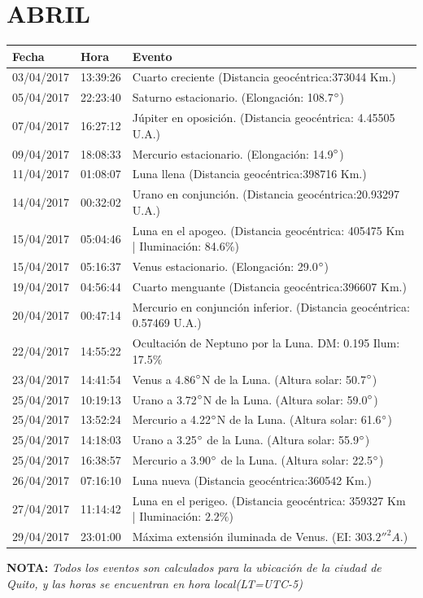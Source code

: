 \documentclass[12pt,a4paper,oneside]{article}
\begin{document}
\section{ABRIL}
\begin{center}
\begin{tabular}{ |l| l| l| }
\hline
 \textbf{Fecha} & \textbf{Hora} & \textbf{Evento}\\
 \hline
03/04/2017& 13:39:26 &	Cuarto creciente (Distancia geocéntrica:373044 Km.)	\\
05/04/2017& 22:23:40 &	Saturno estacionario. (Elongación: 108.7$\degree $)	\\
07/04/2017& 16:27:12 &	Júpiter en oposición. (Distancia geocéntrica: 4.45505 U.A.)	\\
09/04/2017& 18:08:33 &	Mercurio estacionario. (Elongación: 14.9$\degree $)	\\
11/04/2017& 01:08:07 &	Luna llena (Distancia geocéntrica:398716 Km.)	\\
14/04/2017& 00:32:02 &	Urano en conjunción. (Distancia geocéntrica:20.93297 U.A.)	\\
15/04/2017& 05:04:46 &	Luna en el apogeo. (Distancia geocéntrica: 405475 Km | Iluminación: 84.6$\%$)	\\
15/04/2017& 05:16:37 &	Venus estacionario. (Elongación: 29.0$\degree $)	\\
19/04/2017& 04:56:44 &	Cuarto menguante (Distancia geocéntrica:396607 Km.)	\\
20/04/2017& 00:47:14 &	Mercurio en conjunción inferior. (Distancia geocéntrica: 0.57469 U.A.)	\\
22/04/2017& 14:55:22 &	Ocultación de Neptuno por la Luna. DM: 0.195 Ilum: 17.5$\%$ 	\\
23/04/2017& 14:41:54 &	Venus a 4.86$\degree $N de la Luna. (Altura solar: 50.7$\degree $)	\\
25/04/2017& 10:19:13 &	Urano a 3.72$\degree $N de la Luna. (Altura solar: 59.0$\degree $)	\\
25/04/2017& 13:52:24 &	Mercurio a 4.22$\degree $N de la Luna. (Altura solar: 61.6$\degree $)	\\
25/04/2017& 14:18:03 &	Urano a 3.25$\degree $ de la Luna. (Altura solar: 55.9$\degree $)	\\
25/04/2017& 16:38:57 &	Mercurio a 3.90$\degree $ de la Luna. (Altura solar: 22.5$\degree $)	\\
26/04/2017& 07:16:10 &	Luna nueva (Distancia geocéntrica:360542 Km.)	\\
27/04/2017& 11:14:42 &	Luna en el perigeo. (Distancia geocéntrica: 359327 Km | Iluminación: $2.2\%$)	\\
29/04/2017& 23:01:00 &	Máxima extensión iluminada de Venus. (EI: $303.2''^2 A$.)\\
\hline
\end{tabular}
\end{center}
\vspace{1cm}
\textbf{NOTA:  }\textit{Todos los eventos son calculados para la ubicaci\'on de la ciudad de Quito, y las horas se encuentran en hora local(LT=UTC-5)}
\vspace{0.7cm}
\newpage
\end{document}
